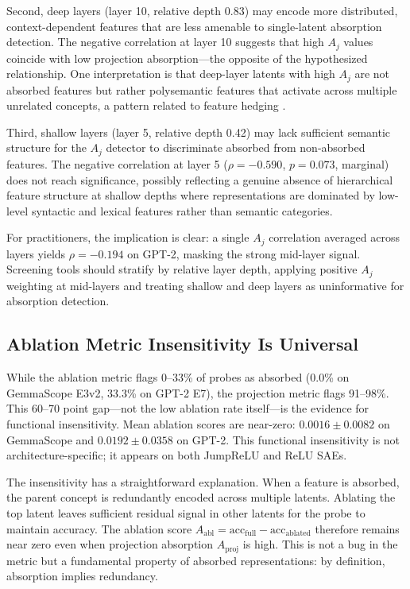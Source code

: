 \documentclass{article}
\begin{document}
Second, deep layers (layer 10, relative depth 0.83) may encode more distributed, context-dependent features that are less amenable to single-latent absorption detection. The negative correlation at layer 10 suggests that high $A_j$ values coincide with low projection absorption---the opposite of the hypothesized relationship. One interpretation is that deep-layer latents with high $A_j$ are not absorbed features but rather polysemantic features that activate across multiple unrelated concepts, a pattern related to feature hedging \citep{chanin2025ahedging}.

Third, shallow layers (layer 5, relative depth 0.42) may lack sufficient semantic structure for the $A_j$ detector to discriminate absorbed from non-absorbed features. The negative correlation at layer 5 ($\rho = -0.590$, $p = 0.073$, marginal) does not reach significance, possibly reflecting a genuine absence of hierarchical feature structure at shallow depths where representations are dominated by low-level syntactic and lexical features rather than semantic categories.

For practitioners, the implication is clear: a single $A_j$ correlation averaged across layers yields $\rho = -0.194$ on GPT-2, masking the strong mid-layer signal. Screening tools should stratify by relative layer depth, applying positive $A_j$ weighting at mid-layers and treating shallow and deep layers as uninformative for absorption detection.

\subsection{Ablation Metric Insensitivity Is Universal}

While the ablation metric flags 0--33\% of probes as absorbed (0.0\% on GemmaScope E3v2, 33.3\% on GPT-2 E7), the projection metric flags 91--98\%. This 60--70 point gap---not the low ablation rate itself---is the evidence for functional insensitivity. Mean ablation scores are near-zero: $0.0016 \pm 0.0082$ on GemmaScope and $0.0192 \pm 0.0358$ on GPT-2. This functional insensitivity is not architecture-specific; it appears on both JumpReLU and ReLU SAEs.

The insensitivity has a straightforward explanation. When a feature is absorbed, the parent concept is redundantly encoded across multiple latents. Ablating the top latent leaves sufficient residual signal in other latents for the probe to maintain accuracy. The ablation score $A_{\text{abl}} = \text{acc}_{\text{full}} - \text{acc}_{\text{ablated}}$ therefore remains near zero even when projection absorption $A_{\text{proj}}$ is high. This is not a bug in the metric but a fundamental property of absorbed representations: by definition, absorption implies redundancy.
\end{document}
